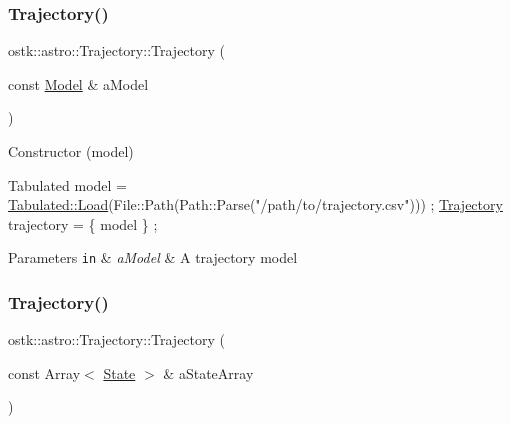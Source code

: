 \subsubsection{\texorpdfstring{Trajectory()}{Trajectory()}\hspace{0.1cm}{\footnotesize\ttfamily [1/3]}}
{\footnotesize\ttfamily ostk\+::astro\+::\+Trajectory\+::\+Trajectory (\begin{DoxyParamCaption}\item[{const \hyperlink{classostk_1_1astro_1_1trajectory_1_1_model}{Model} \&}]{a\+Model }\end{DoxyParamCaption})}



Constructor (model) 


\begin{DoxyCode}
Tabulated model = \hyperlink{classostk_1_1astro_1_1trajectory_1_1models_1_1_tabulated_a81cf8ebea4354805ab69e732bfe73d77}{Tabulated::Load}(File::Path(Path::Parse(\textcolor{stringliteral}{"/path/to/trajectory.csv"}))) ;
\hyperlink{classostk_1_1astro_1_1_trajectory_a9333200bd6afed5aef4f5aad8a2a8e84}{Trajectory} trajectory = \{ model \} ;
\end{DoxyCode}



\begin{DoxyParams}[1]{Parameters}
\mbox{\tt in}  & {\em a\+Model} & A trajectory model \\
\hline
\end{DoxyParams}
\mbox{\label{classostk_1_1astro_1_1_trajectory_a5bffa48518940b06d353988efdeb098a}} 
\subsubsection{\texorpdfstring{Trajectory()}{Trajectory()}\hspace{0.1cm}{\footnotesize\ttfamily [2/3]}}
{\footnotesize\ttfamily ostk\+::astro\+::\+Trajectory\+::\+Trajectory (\begin{DoxyParamCaption}\item[{const Array$<$ \hyperlink{classostk_1_1astro_1_1trajectory_1_1_state}{State} $>$ \&}]{a\+State\+Array }\end{DoxyParamCaption})}



